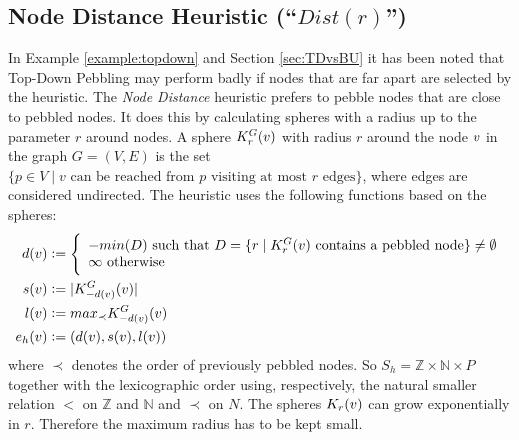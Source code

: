 \subsection{Node Distance Heuristic (``$Dist(r)$'')}
\label{sec:distance}

In Example \ref{example:topdown} and Section \ref{sec:TDvsBU} it has been noted that Top-Down Pebbling may perform badly if nodes that are far apart are selected by the heuristic.
The \emph{Node Distance} heuristic prefers to pebble nodes that are close to pebbled nodes. It does this by calculating spheres with a radius up to the parameter $r$ around nodes.
A sphere $K_r^{G}(v)$ with radius $r$ around the node $v$ in the graph $G = (V,E)$ is the set $\{p \in V \mid v \text{ can be reached from } p \text{ visiting at most } r \text{ edges}\}$, where edges are considered undirected. 
The heuristic uses the following functions based on the spheres:
\begin{align*}
	d(v) &\mathrel{\mathop:}= \Bigg\{
	\begin{array}{l}
		-min(D) \text{ such that } D = \{r \mid K_r^{G}(v)\text{ contains a pebbled node}\} \neq \emptyset\\
		\infty \text{ otherwise}
		\end{array}\\
	s(v) &\mathrel{\mathop:}= |K_{-d(v)}^G(v)|\\
	l(v) &\mathrel{\mathop:}= max_{\prec}K_{-d(v)}^G(v)\\
	e_h(v) &\mathrel{\mathop:}= (d(v),s(v),l(v))
\end{align*}
where $\prec$ denotes the order of previously pebbled nodes.
So $S_h = \mathbb{Z} \times \mathbb{N} \times P$ together with the lexicographic order using, respectively, the natural smaller relation $<$ on $\mathbb{Z}$ and $\mathbb{N}$ and $\prec$ on $N$. The spheres $K_r(v)$ can grow exponentially in $r$. Therefore the maximum radius has to be kept small.


